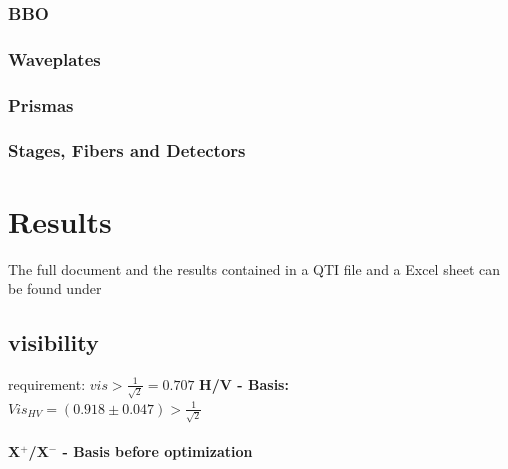 \documentclass[12pt,a4paper]{article}
\begin{document}
\begin{multicols}{2}
\subsubsection{BBO}
\subsubsection{Waveplates}
\subsubsection{Prismas}
\subsubsection{Stages, Fibers and Detectors}

\section{Results}
The full document and the results contained in a QTI file and a Excel sheet can be found under \cite{github}
\subsection{visibility}
requirement: $vis > \frac{1}{\sqrt{2}} = 0.707$
\noindent \textbf{H/V - Basis:}\\

%

$Vis_{HV}= (0.918 \pm 0.047) > \frac{1}{\sqrt{2}}$\\
\\
\textbf{X$^+$/X$^-$ - Basis before optimization}\\


\end{multicols}
\end{document}
